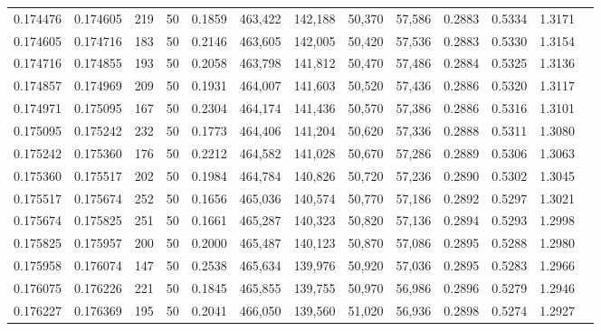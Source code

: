 \begin{tabular}{rrrrrrrrrrrrr}
0.174476 & 0.174605 &   219 &  50 &                                     0.1859 & 463,422 & 142,188 &  50,370 &  57,586 & 0.2883 & 0.5334 & 1.3171 \\
0.174605 & 0.174716 &   183 &  50 &                                     0.2146 & 463,605 & 142,005 &  50,420 &  57,536 & 0.2883 & 0.5330 & 1.3154 \\
0.174716 & 0.174855 &   193 &  50 &                                     0.2058 & 463,798 & 141,812 &  50,470 &  57,486 & 0.2884 & 0.5325 & 1.3136 \\
0.174857 & 0.174969 &   209 &  50 &                                     0.1931 & 464,007 & 141,603 &  50,520 &  57,436 & 0.2886 & 0.5320 & 1.3117 \\
0.174971 & 0.175095 &   167 &  50 &                                     0.2304 & 464,174 & 141,436 &  50,570 &  57,386 & 0.2886 & 0.5316 & 1.3101 \\
0.175095 & 0.175242 &   232 &  50 &                                     0.1773 & 464,406 & 141,204 &  50,620 &  57,336 & 0.2888 & 0.5311 & 1.3080 \\
0.175242 & 0.175360 &   176 &  50 &                                     0.2212 & 464,582 & 141,028 &  50,670 &  57,286 & 0.2889 & 0.5306 & 1.3063 \\
0.175360 & 0.175517 &   202 &  50 &                                     0.1984 & 464,784 & 140,826 &  50,720 &  57,236 & 0.2890 & 0.5302 & 1.3045 \\
0.175517 & 0.175674 &   252 &  50 &                                     0.1656 & 465,036 & 140,574 &  50,770 &  57,186 & 0.2892 & 0.5297 & 1.3021 \\
0.175674 & 0.175825 &   251 &  50 &                                     0.1661 & 465,287 & 140,323 &  50,820 &  57,136 & 0.2894 & 0.5293 & 1.2998 \\
0.175825 & 0.175957 &   200 &  50 &                                     0.2000 & 465,487 & 140,123 &  50,870 &  57,086 & 0.2895 & 0.5288 & 1.2980 \\
0.175958 & 0.176074 &   147 &  50 &                                     0.2538 & 465,634 & 139,976 &  50,920 &  57,036 & 0.2895 & 0.5283 & 1.2966 \\
0.176075 & 0.176226 &   221 &  50 &                                     0.1845 & 465,855 & 139,755 &  50,970 &  56,986 & 0.2896 & 0.5279 & 1.2946 \\
0.176227 & 0.176369 &   195 &  50 &                                     0.2041 & 466,050 & 139,560 &  51,020 &  56,936 & 0.2898 & 0.5274 & 1.2927 \\

\end{tabular}
